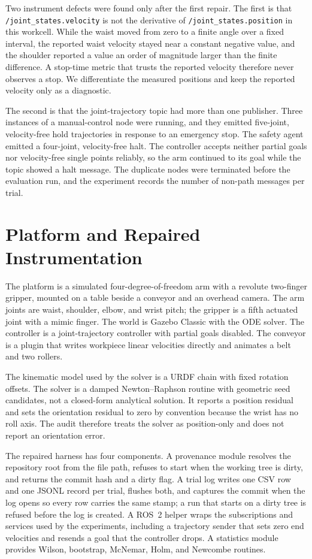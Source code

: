 \documentclass[journal]{IEEEtran}
\begin{document}
Two instrument defects were found only after the first repair. The first is that \texttt{/joint\_states.velocity} is not the derivative of \texttt{/joint\_states.position} in this workcell. While the waist moved from zero to a finite angle over a fixed interval, the reported waist velocity stayed near a constant negative value, and the shoulder reported a value an order of magnitude larger than the finite difference. A stop-time metric that trusts the reported velocity therefore never observes a stop. We differentiate the measured positions and keep the reported velocity only as a diagnostic.

The second is that the joint-trajectory topic had more than one publisher. Three instances of a manual-control node were running, and they emitted five-joint, velocity-free hold trajectories in response to an emergency stop. The safety agent emitted a four-joint, velocity-free halt. The controller accepts neither partial goals nor velocity-free single points reliably, so the arm continued to its goal while the topic showed a halt message. The duplicate nodes were terminated before the evaluation run, and the experiment records the number of non-path messages per trial.

\section{Platform and Repaired Instrumentation}
\label{sec:platform}
The platform is a simulated four-degree-of-freedom arm with a revolute two-finger gripper, mounted on a table beside a conveyor and an overhead camera. The arm joints are waist, shoulder, elbow, and wrist pitch; the gripper is a fifth actuated joint with a mimic finger. The world is Gazebo Classic with the ODE solver. The controller is a joint-trajectory controller with partial goals disabled. The conveyor is a plugin that writes workpiece linear velocities directly and animates a belt and two rollers.

The kinematic model used by the solver is a URDF chain with fixed rotation offsets. The solver is a damped Newton--Raphson routine with geometric seed candidates, not a closed-form analytical solution. It reports a position residual and sets the orientation residual to zero by convention because the wrist has no roll axis. The audit therefore treats the solver as position-only and does not report an orientation error.

The repaired harness has four components. A provenance module resolves the repository root from the file path, refuses to start when the working tree is dirty, and returns the commit hash and a dirty flag. A trial log writes one CSV row and one JSONL record per trial, flushes both, and captures the commit when the log opens so every row carries the same stamp; a run that starts on a dirty tree is refused before the log is created. A ROS~2 helper wraps the subscriptions and services used by the experiments, including a trajectory sender that sets zero end velocities and resends a goal that the controller drops. A statistics module provides Wilson, bootstrap, McNemar, Holm, and Newcombe routines.
\end{document}
